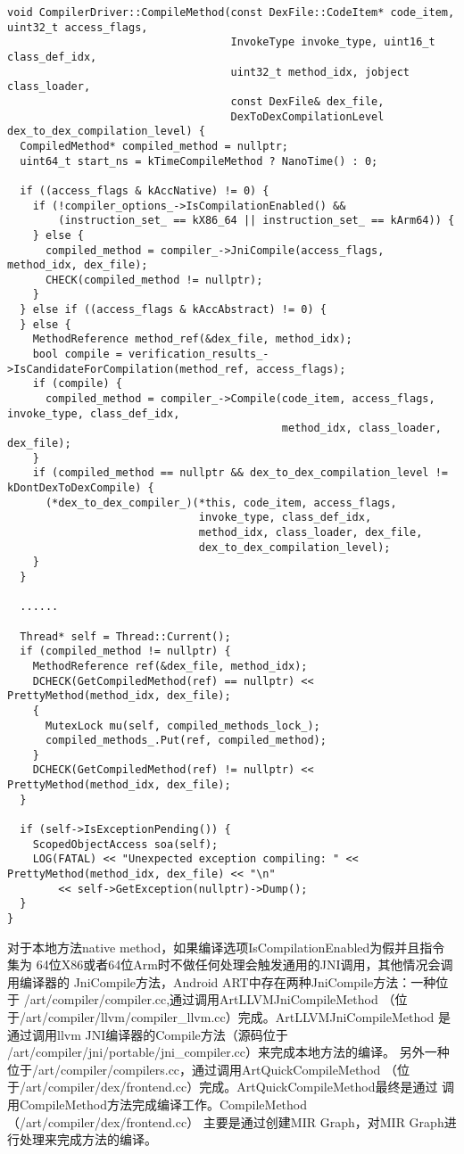 \begin{lstlisting}
void CompilerDriver::CompileMethod(const DexFile::CodeItem* code_item, uint32_t access_flags,
                                   InvokeType invoke_type, uint16_t class_def_idx,
                                   uint32_t method_idx, jobject class_loader,
                                   const DexFile& dex_file,
                                   DexToDexCompilationLevel dex_to_dex_compilation_level) {
  CompiledMethod* compiled_method = nullptr;
  uint64_t start_ns = kTimeCompileMethod ? NanoTime() : 0;

  if ((access_flags & kAccNative) != 0) {
    if (!compiler_options_->IsCompilationEnabled() &&
        (instruction_set_ == kX86_64 || instruction_set_ == kArm64)) {
    } else {
      compiled_method = compiler_->JniCompile(access_flags, method_idx, dex_file);
      CHECK(compiled_method != nullptr);
    }
  } else if ((access_flags & kAccAbstract) != 0) {
  } else {
    MethodReference method_ref(&dex_file, method_idx);
    bool compile = verification_results_->IsCandidateForCompilation(method_ref, access_flags);
    if (compile) {     
      compiled_method = compiler_->Compile(code_item, access_flags, invoke_type, class_def_idx,
                                           method_idx, class_loader, dex_file);
    }
    if (compiled_method == nullptr && dex_to_dex_compilation_level != kDontDexToDexCompile) {
      (*dex_to_dex_compiler_)(*this, code_item, access_flags,
                              invoke_type, class_def_idx,
                              method_idx, class_loader, dex_file,
                              dex_to_dex_compilation_level);
    }
  }

  ......

  Thread* self = Thread::Current();
  if (compiled_method != nullptr) {
    MethodReference ref(&dex_file, method_idx);
    DCHECK(GetCompiledMethod(ref) == nullptr) << PrettyMethod(method_idx, dex_file);
    {
      MutexLock mu(self, compiled_methods_lock_);
      compiled_methods_.Put(ref, compiled_method);
    }
    DCHECK(GetCompiledMethod(ref) != nullptr) << PrettyMethod(method_idx, dex_file);
  }

  if (self->IsExceptionPending()) {
    ScopedObjectAccess soa(self);
    LOG(FATAL) << "Unexpected exception compiling: " << PrettyMethod(method_idx, dex_file) << "\n"
        << self->GetException(nullptr)->Dump();
  }
}
\end{lstlisting}
对于本地方法native method，如果编译选项IsCompilationEnabled为假并且指令集为
64位X86或者64位Arm时不做任何处理会触发通用的JNI调用，其他情况会调用编译器的
JniCompile方法，Android ART中存在两种JniCompile方法：一种位于
/art/compiler/compiler.cc,通过调用ArtLLVMJniCompileMethod
（位于/art/compiler/llvm/compiler\_llvm.cc）完成。ArtLLVMJniCompileMethod
是通过调用llvm JNI编译器的Compile方法（源码位于
/art/compiler/jni/portable/jni\_compiler.cc）来完成本地方法的编译。
另外一种位于/art/compiler/compilers.cc，通过调用ArtQuickCompileMethod
（位于/art/compiler/dex/frontend.cc）完成。ArtQuickCompileMethod最终是通过
调用CompileMethod方法完成编译工作。CompileMethod（/art/compiler/dex/frontend.cc）
主要是通过创建MIR Graph，对MIR Graph进行处理来完成方法的编译。

